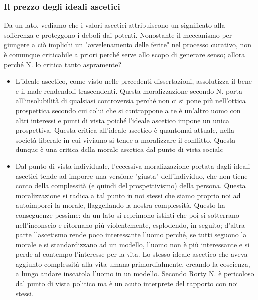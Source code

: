 \documentclass[10pt,a4paper]{article}
\begin{document}
\subsubsection{Il prezzo degli ideali ascetici}
Da un lato, vediamo che i valori ascetici attribuiscono un significato alla sofferenza e proteggono i deboli dai potenti. Nonostante il meccanismo per giungere a ciò implichi un "avvelenamento delle ferite" nel processo curativo, non è comunque criticabile a priori perché serve allo scopo di generare senso; allora perché N. lo critica tanto aspramente?
\begin{itemize}
	\item L'ideale ascetico, come visto nelle precedenti dissertazioni, assolutizza il bene e il male rendendoli trascendenti. Questa moralizzazione secondo N. porta all'insolubilità di qualsiasi controversia perché non ci si pone più nell'ottica prospettica secondo cui colui che si contrappone a te è un'altro uomo con altri interessi e punti di vista poiché l'ideale ascetico impone un unica prospettiva. Questa critica all'ideale ascetico è quantomai attuale, nella società liberale in cui viviamo si tende a moralizzare il conflitto. Questa dunque è una critica della morale ascetica dal punto di vista sociale
	\item Dal punto di vista individuale, l'eccessiva moralizzazione portata dagli ideali ascetici tende ad imporre una versione "giusta" dell'individuo, che non tiene conto della complessità (e quindi del prospettivismo) della persona. Questa moralizzazione si radica a tal punto in noi stessi che siamo proprio noi ad autoimporci la morale, flaggellando la nostra complessità. Questo ha conseguenze pessime: da un lato si reprimono istinti che poi si sotterrano nell'inconscio e ritornano più violentemente, esplodendo, in seguito; d'altra parte l'ascetismo rende poco interessante l'uomo perché, se tutti seguono la morale e si standardizzano ad un modello, l'uomo non è più interessante e si perde al contempo l'interesse per la vita. Lo stesso ideale ascetico che aveva aggiunto complessità alla vita umana primordialmente, creando la coscienza, a lungo andare inscatola l'uomo in un modello. Secondo Rorty N. è pericoloso dal punto di vista politico ma è un acuto interprete del rapporto con noi stessi. 
\end{itemize}
\end{document}
